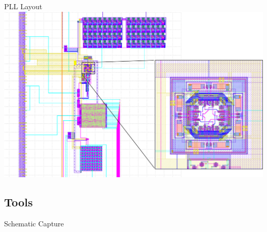 \documentclass[10pt]{beamer}
\begin{document}
\begin{frame}{PLL Layout}
\includegraphics[scale=0.25]{pll_vco_layout}
\end{frame}



\subsection*{Tools}

\frame{\subsectionpage}

\begin{frame}{Schematic Capture}

\begin{figure}[h]
\end{figure}


\end{frame}
\end{document}
